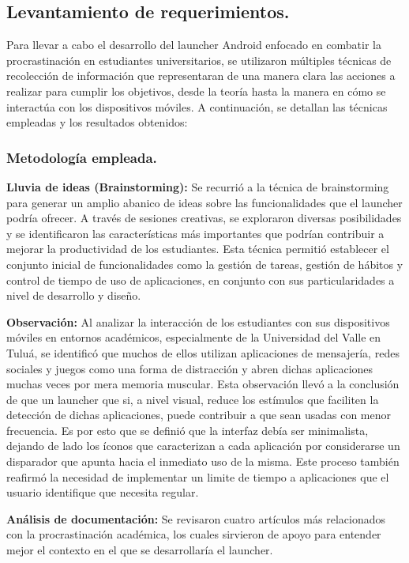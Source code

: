 \subsection{Levantamiento de requerimientos.}

Para llevar a cabo el desarrollo del launcher Android enfocado en combatir la procrastinación en estudiantes universitarios, se utilizaron múltiples técnicas de recolección de información que representaran de una manera clara las acciones a realizar para cumplir los objetivos, desde la teoría hasta la manera en cómo se interactúa con los dispositivos móviles. A continuación, se detallan las técnicas empleadas y los resultados obtenidos:

\subsubsection{Metodología empleada.}

\textbf{Lluvia de ideas (Brainstorming):} Se recurrió a la técnica de brainstorming para generar un amplio abanico de ideas sobre las funcionalidades que el launcher podría ofrecer. A través de sesiones creativas, se exploraron diversas posibilidades y se identificaron las características más importantes que podrían contribuir a mejorar la productividad de los estudiantes. Esta técnica permitió establecer el conjunto inicial de funcionalidades como la gestión de tareas, gestión de hábitos y control de tiempo de uso de aplicaciones, en conjunto con sus particularidades a nivel de desarrollo y diseño.

\textbf{Observación:} Al analizar la interacción de los estudiantes con sus dispositivos móviles en entornos académicos, especialmente de la Universidad del Valle en Tuluá, se identificó que muchos de ellos utilizan aplicaciones de mensajería, redes sociales y juegos como una forma de distracción y abren dichas aplicaciones muchas veces por mera memoria muscular. Esta observación llevó a la conclusión de que un launcher que si, a nivel visual, reduce los estímulos que faciliten la detección de dichas aplicaciones, puede contribuir a que sean usadas con menor frecuencia. Es por esto que se definió que la interfaz debía ser minimalista, dejando de lado los íconos que caracterizan a cada aplicación por considerarse un disparador que apunta hacia el inmediato uso de la misma. Este proceso también reafirmó la necesidad de implementar un limite de tiempo a aplicaciones que el usuario identifique que necesita regular.

\textbf{Análisis de documentación:} Se revisaron cuatro artículos más relacionados con la procrastinación académica, los cuales sirvieron de apoyo para entender mejor el contexto en el que se desarrollaría el launcher.

